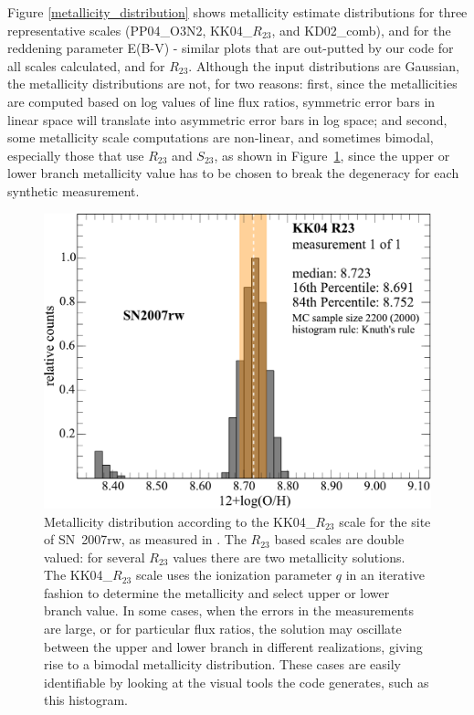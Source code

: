 \documentclass{emulateapj}
\begin{document}
Figure \ref{metallicity_distribution} shows metallicity estimate distributions for three representative scales (PP04\_O3N2, KK04\_$R_{23}$, and KD02\_comb), and for the reddening parameter E(B-V) - similar plots that are out-putted by our code for all scales calculated, and for $R_{23}$. Although the input distributions are Gaussian, the metallicity distributions are not, for two reasons: first, since the metallicities are computed based on log values of line flux ratios, symmetric error bars in linear space will translate into asymmetric error bars in log space; and second, some metallicity scale computations are non-linear, and sometimes bimodal, especially those that use $R_{23}$ and $S_{23}$, as shown in Figure~\ref{metallicity_bimodal}, since the upper or lower branch metallicity value has to be chosen to break the degeneracy for each synthetic measurement.
\begin{figure}[ht!]
\includegraphics[width=1.0\columnwidth]{SN2007rw_n2000_KK04_R23_1.pdf}
\caption{Metallicity distribution according to the KK04\_$R_{23}$ scale for the site of SN~2007rw, as measured in  \citet{modjaz11}. The $R_{23}$ based scales are double valued: for several $R_{23}$ values there are two metallicity solutions. The KK04\_$R_{23}$ scale uses the ionization parameter $q$ in an iterative fashion to determine the metallicity and select upper or lower branch value. In some cases, when the errors in the measurements are large, or for particular flux ratios, the solution may oscillate between the upper and lower branch in different realizations, giving rise to a bimodal metallicity distribution. These cases are easily identifiable by looking at the visual tools the code generates, such as this histogram.}\label{metallicity_bimodal}
\end{figure}
\end{document}
